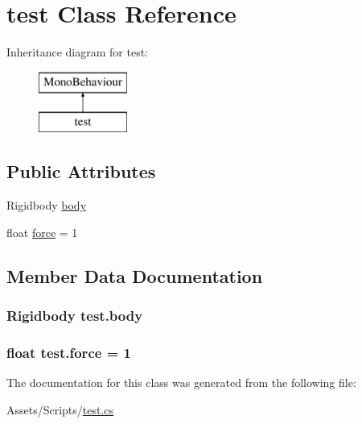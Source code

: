 \hypertarget{classtest}{}\section{test Class Reference}
\label{classtest}
Inheritance diagram for test\+:\begin{figure}[H]
\begin{center}
\leavevmode
\includegraphics[height=2.000000cm]{classtest}
\end{center}
\end{figure}
\subsection*{Public Attributes}
\begin{DoxyCompactItemize}
\item 
Rigidbody \hyperlink{classtest_ae413e1d589d311bca4f8306e479a5e2d}{body}
\item 
float \hyperlink{classtest_ad02851c5ad217c395ee6c008a652bc93}{force} = 1
\end{DoxyCompactItemize}


\subsection{Member Data Documentation}
\hypertarget{classtest_ae413e1d589d311bca4f8306e479a5e2d}{}
\subsubsection[{body}]{\setlength{\rightskip}{0pt plus 5cm}Rigidbody test.\+body}\label{classtest_ae413e1d589d311bca4f8306e479a5e2d}
\hypertarget{classtest_ad02851c5ad217c395ee6c008a652bc93}{}
\subsubsection[{force}]{\setlength{\rightskip}{0pt plus 5cm}float test.\+force = 1}\label{classtest_ad02851c5ad217c395ee6c008a652bc93}


The documentation for this class was generated from the following file\+:\begin{DoxyCompactItemize}
\item 
Assets/\+Scripts/\hyperlink{test_8cs}{test.\+cs}\end{DoxyCompactItemize}
